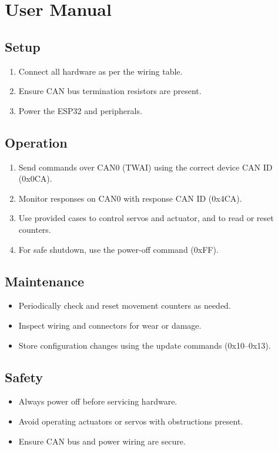 \documentclass[12pt,a4paper]{article}
\begin{document}
\section{User Manual}
\subsection{Setup}
\begin{enumerate}
    \item Connect all hardware as per the wiring table.
    \item Ensure CAN bus termination resistors are present.
    \item Power the ESP32 and peripherals.
\end{enumerate}

\subsection{Operation}
\begin{enumerate}
    \item Send commands over CAN0 (TWAI) using the correct device CAN ID (0x0CA).
    \item Monitor responses on CAN0 with response CAN ID (0x4CA).
    \item Use provided cases to control servos and actuator, and to read or reset counters.
    \item For safe shutdown, use the power-off command (0xFF).
\end{enumerate}

\subsection{Maintenance}
\begin{itemize}
    \item Periodically check and reset movement counters as needed.
    \item Inspect wiring and connectors for wear or damage.
    \item Store configuration changes using the update commands (0x10--0x13).
\end{itemize}

\subsection{Safety}
\begin{itemize}
    \item Always power off before servicing hardware.
    \item Avoid operating actuators or servos with obstructions present.
    \item Ensure CAN bus and power wiring are secure.
\end{itemize}
\end{document}
